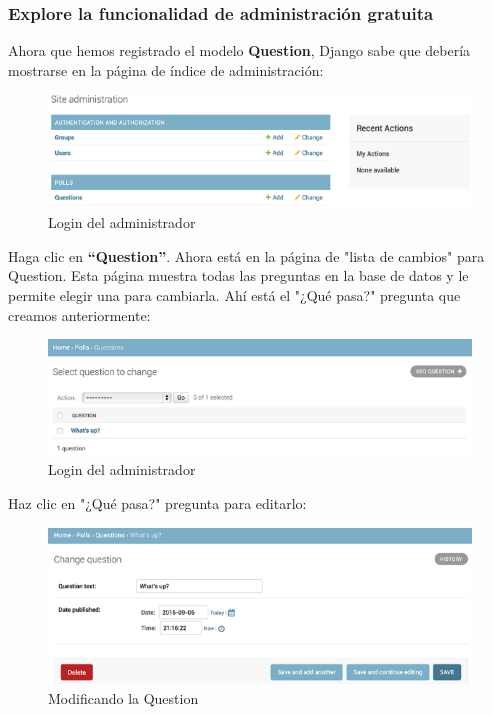 \documentclass[10pt]{article}
\newcommand{\django}[1]{{\textcolor{G}{Django} #1}}
\begin{document}
\subsubsection*{Explore la funcionalidad de administración gratuita}


Ahora que hemos registrado el modelo \textbf{Question}, \django{} sabe que debería mostrarse en la página de índice de administración:

\begin{figure}[H]
\begin{center}
\includegraphics[scale=0.9]{figuras/3/32/325/img4.png}
\caption{Login del administrador}
\end{center}
\end{figure}


Haga clic en \textbf{``Question''}. Ahora está en la página de "lista de cambios" para Question. Esta página muestra todas las preguntas en la base de datos y le permite elegir una para cambiarla. Ahí está el "¿Qué pasa?" pregunta que creamos anteriormente:

\begin{figure}[H]
\begin{center}
\includegraphics[scale=0.9]{figuras/3/32/325/img5.png}
\caption{Login del administrador}
\end{center}
\end{figure}


Haz clic en "¿Qué pasa?" pregunta para editarlo:

\begin{figure}[H]
\begin{center}
\includegraphics[scale=0.9]{figuras/3/32/325/img6.png}
\caption{Modificando la Question}
\end{center}
\end{figure}
\end{document}
